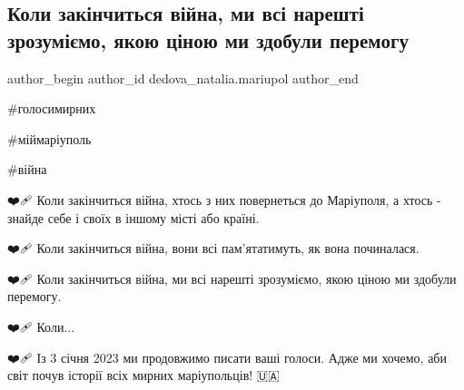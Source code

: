 
 
 
 
 

\subsection{ Коли закінчиться війна, ми всі нарешті зрозуміємо, якою ціною ми здобули перемогу}
\label{sec:31_12_2022.fb.dedova_natalia.mariupol.1._koli_zak_nchitsya_v}

\ifcmt
 author_begin
   author_id dedova_natalia.mariupol
 author_end
\fi

\#голосимирних

\#міймаріуполь

\#війна

❤️🩹 Коли закінчиться війна, хтось з них повернеться до Маріуполя, а хтось -
знайде себе і своїх в іншому місті або країні. 

❤️🩹 Коли закінчиться війна, вони всі пам'ятатимуть, як вона починалася. 

❤️🩹 Коли закінчиться війна, ми всі нарешті зрозуміємо, якою ціною ми здобули
перемогу. 

❤️🩹 Коли...

❤️🩹 Із 3 січня 2023 ми продовжимо писати ваші голоси. Адже ми хочемо, аби світ
почув історії всіх мирних маріупольців! 🇺🇦
